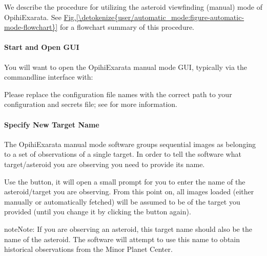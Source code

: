 \documentclass[letterpaper,11pt,english]{sphinxmanual}
\begin{document}
\sphinxAtStartPar
We describe the procedure for utilizing the asteroid view\sphinxhyphen{}finding (manual)
mode of OpihiExarata. See \hyperref[\detokenize{user/automatic_mode:figure-automatic-mode-flowchart}]{Fig.\@ \ref{\detokenize{user/automatic_mode:figure-automatic-mode-flowchart}}} for a
flowchart summary of this procedure.


\paragraph{Start and Open GUI}
\label{\detokenize{user/manual_mode:start-and-open-gui}}
\sphinxAtStartPar
You will want to open the OpihiExarata manual mode GUI, typically via the
command\sphinxhyphen{}line interface with:

\begin{sphinxVerbatim}[commandchars=\\\{\}]
   
\end{sphinxVerbatim}

\sphinxAtStartPar
Please replace the configuration file names with the correct path to your
configuration and secrets file; see {\hyperref[\detokenize{user/configuration:user-configuration}]{}} for more
information.


\paragraph{Specify New Target Name}
\label{\detokenize{user/manual_mode:specify-new-target-name}}\label{\detokenize{user/manual_mode:user-manual-mode-procedure-specify-new-target-name}}
\sphinxAtStartPar
The OpihiExarata manual mode software groups sequential images as belonging to
a set of observations of a single target. In order to tell the software what
target/asteroid you are observing you need to provide its name.

\sphinxAtStartPar
Use the  button, it will open a small prompt for you to
enter the name of the asteroid/target you are observing. From this point on,
all images loaded (either manually or automatically fetched) will be assumed
to be of the target you provided (until you change it by clicking the button
again).

\begin{sphinxadmonition}{note}{Note:}
\sphinxAtStartPar
If you are observing an asteroid, this target name should also be the name
of the asteroid. The software will attempt to use this name to obtain
historical observations from the Minor Planet Center.
\end{sphinxadmonition}
\end{document}

